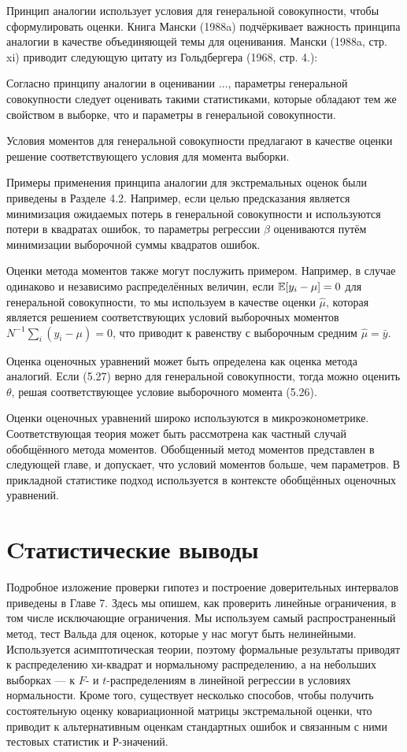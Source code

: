 Принцип аналогии использует условия для генеральной совокупности, чтобы сформулировать оценки. Книга Мански (1988a) подчёркивает важность принципа аналогии в качестве объединяющей темы для оценивания. Мански (1988a, стр. xi) приводит следующую цитату из Гольдбергера (1968, стр. 4.):

Согласно принципу аналогии в оценивании $\dots$, параметры генеральной совокупности следует оценивать такими статистиками, которые обладают тем же свойством в выборке, что и параметры в генеральной совокупности.

Условия моментов для генеральной совокупности предлагают в качестве оценки решение соответствующего условия для момента выборки.

Примеры применения принципа аналогии для экстремальных оценок были приведены в Разделе 4.2. Например, если целью предсказания является минимизация ожидаемых потерь в генеральной совокупности и используются потери в квадратах ошибок, то параметры регрессии $\beta$ оцениваются путём минимизации выборочной суммы квадратов ошибок.

Оценки метода моментов также могут послужить примером. Например, в случае одинаково и независимо распределённых величин, если $\mathbb{E}[y_i-\mu]=0$ для генеральной совокупности, то мы используем в качестве оценки $\hat{\mu}$, которая является решением соответствующих условий выборочных моментов $N^{-1} \sum_i (y_i-\mu)=0$, что приводит к равенству с выборочным средним $\hat{\mu}=\bar{y}$.


Оценка оценочных уравнений может быть определена как оценка метода аналогий. Если (5.27) верно для генеральной совокупности, тогда можно оценить $\theta$, решая соответствующее условие выборочного момента (5.26).

Оценки оценочных уравнений широко используются в микроэконометрике. Соответствующая теория может быть рассмотрена как частный случай обобщённого метода моментов. Обобщенный метод моментов представлен в следующей главе, и допускает, что условий моментов больше, чем параметров. В прикладной статистике подход используется в контексте обобщённых оценочных уравнений.

\section{Cтатистические выводы} 

Подробное изложение проверки гипотез и построение доверительных интервалов приведены в Главе 7. Здесь мы опишем, как проверить линейные ограничения, в том числе исключающие ограничения. Мы используем самый распространенный метод, тест Вальда для оценок, которые у нас могут быть нелинейными.  Используется асимптотическая теории, поэтому формальные результаты приводят к распределению хи-квадрат и нормальному распределению, а на небольших выборках --- к $F$- и $t$-распределениям в линейной регрессии в условиях нормальности. Кроме того, существует несколько способов, чтобы получить состоятельную оценку ковариационной матрицы экстремальной оценки, что приводит к альтернативным оценкам стандартных ошибок и связанным с ними тестовых статистик и Р-значений.

